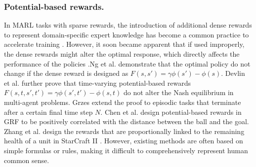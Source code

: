 \subsubsection{Potential-based rewards.}In MARL tasks with sparse rewards, the introduction of additional dense rewards to represent domain-specific expert knowledge has become a common practice to accelerate training \cite{mguni2021ligs,ma2022elign}. However, it soon became apparent that if used improperly, the dense rewards might alter the optimal response, which directly affects the performance of the policies \cite{csimcsek2006intrinsic}.Ng et al. \cite{ng1999policy} demonstrate that the optimal policy do not change if the dense reward is designed as $F(s,s')=\gamma\phi(s')-\phi(s)$. Devlin et al. \cite{devlin2012dynamic} further prove that time-varying potential-based rewards $F(s,t,s',t')=\gamma\phi(s',t')-\phi(s,t)$ do not alter the Nash equilibrium in multi-agent problems. Grzes \cite{grzes2017reward} extend the proof to episodic tasks that terminate after a certain final time step $N$. Chen et al. \cite{chen2022knowledge} design potential-based rewards in GRF to be positively correlated with the distance between the ball and the goal. Zhang et al. \cite{zhang2023multiexperience} design the rewards that are proportionally linked to the remaining health of a unit in StarCraft II \cite{samvelyan2019starcraft}. However, existing methods are often based on simple formulas or rules, making it difficult to comprehensively represent human common sense.